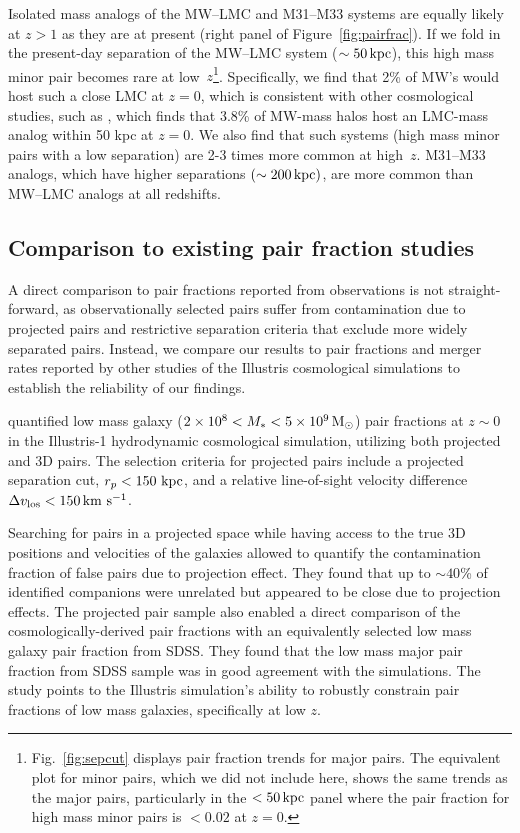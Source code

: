 \documentclass[linenumbers,twocolumn]{aastex631}
\begin{document}
    Isolated mass analogs of the MW--LMC and M31--M33 systems are equally likely at $z>1$ as they are at present (right panel of Figure~\ref{fig:pairfrac}). 
    If we fold in the present-day separation of the MW--LMC system ($\sim50 \mathrm{\,kpc}$), this high mass minor pair becomes rare at low~$z$\footnote{Fig.~\ref{fig:sepcut} displays pair fraction trends for major pairs. The equivalent plot for minor pairs, which we did not include here, shows the same trends as the major pairs, particularly in the $<50\mathrm{\,kpc}$ panel where the pair fraction for high mass minor pairs is $<0.02$ at $z=0$.}. Specifically, we find that 2\% of MW's would host such a close LMC at $z=0$, which is consistent with other cosmological studies, such as \citet{Patel2017a-Orbits}, which finds that 3.8\% of MW-mass halos host an LMC-mass analog within 50 kpc at $z=0$. 
    We also find that such systems (high mass minor pairs with a low separation) are 2-3 times more common at high~$z$. M31--M33 analogs, which have higher separations $(\sim200\mathrm{\,kpc})$, are more common than MW--LMC analogs at all redshifts.  


    
\subsection{Comparison to existing pair fraction studies}\label{sec:disc-comp}
    A direct comparison to pair fractions reported from observations is not straight-forward, as observationally selected pairs suffer from contamination due to projected pairs and restrictive separation criteria that exclude more widely separated pairs.
    Instead, we compare our results to pair fractions and merger rates reported by other studies of the Illustris cosmological simulations to establish the reliability of our findings. 

        \citet{Besla2018} quantified low mass galaxy ($2\times10^{8} < M_{*} < 5\times10^{9}\,\mathrm{M}_\odot$) pair fractions at $z\sim0$ in the Illustris-1 hydrodynamic cosmological simulation, utilizing both projected and 3D pairs.
        The selection criteria for projected pairs include a projected separation cut, $r_{p} < 150\,\mathrm{\,kpc}$, and a relative line-of-sight velocity difference $\Delta v_{\rm los} < 150\,\mathrm{km}~\mathrm{s}^{-1}$.
        
        Searching for pairs in a projected space while having access to the true 3D positions and velocities of the galaxies allowed \cite{Besla2018} to quantify the contamination fraction of false pairs due to projection effect. 
        They found that up to $\sim40$\% of identified companions were unrelated but appeared to be close due to projection effects. 
        The projected pair sample also enabled a direct comparison of the cosmologically-derived pair fractions with an equivalently selected low mass galaxy pair fraction from SDSS.
        They found that the low mass major pair fraction from SDSS sample was in good agreement with the simulations. The~\citet{Besla2018} study points to the Illustris simulation's ability to robustly constrain pair fractions of low mass galaxies, specifically at low $z$.
\end{document}
